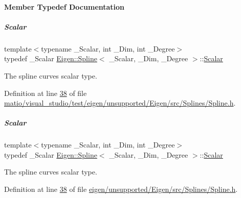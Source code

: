 \paragraph{Member Typedef Documentation}
\mbox{\label{group___splines___module_a8cafd78b564825c76fbb3419653d9742}} 
\subparagraph{\texorpdfstring{Scalar}{Scalar}\hspace{0.1cm}{\footnotesize\ttfamily [1/2]}}
{\footnotesize\ttfamily template$<$typename \+\_\+\+Scalar, int \+\_\+\+Dim, int \+\_\+\+Degree$>$ \\
typedef \+\_\+\+Scalar \hyperlink{group___splines___module_class_eigen_1_1_spline}{Eigen\+::\+Spline}$<$ \+\_\+\+Scalar, \+\_\+\+Dim, \+\_\+\+Degree $>$\+::\hyperlink{group___splines___module_a8cafd78b564825c76fbb3419653d9742}{Scalar}}

The spline curve\textquotesingle{}s scalar type. 

Definition at line \hyperlink{matio_2visual__studio_2test_2eigen_2unsupported_2_eigen_2src_2_splines_2_spline_8h_source_l00038}{38} of file \hyperlink{matio_2visual__studio_2test_2eigen_2unsupported_2_eigen_2src_2_splines_2_spline_8h_source}{matio/visual\+\_\+studio/test/eigen/unsupported/\+Eigen/src/\+Splines/\+Spline.\+h}.

\mbox{\label{group___splines___module_a8cafd78b564825c76fbb3419653d9742}} 
\subparagraph{\texorpdfstring{Scalar}{Scalar}\hspace{0.1cm}{\footnotesize\ttfamily [2/2]}}
{\footnotesize\ttfamily template$<$typename \+\_\+\+Scalar, int \+\_\+\+Dim, int \+\_\+\+Degree$>$ \\
typedef \+\_\+\+Scalar \hyperlink{group___splines___module_class_eigen_1_1_spline}{Eigen\+::\+Spline}$<$ \+\_\+\+Scalar, \+\_\+\+Dim, \+\_\+\+Degree $>$\+::\hyperlink{group___splines___module_a8cafd78b564825c76fbb3419653d9742}{Scalar}}

The spline curve\textquotesingle{}s scalar type. 

Definition at line \hyperlink{eigen_2unsupported_2_eigen_2src_2_splines_2_spline_8h_source_l00038}{38} of file \hyperlink{eigen_2unsupported_2_eigen_2src_2_splines_2_spline_8h_source}{eigen/unsupported/\+Eigen/src/\+Splines/\+Spline.\+h}.



